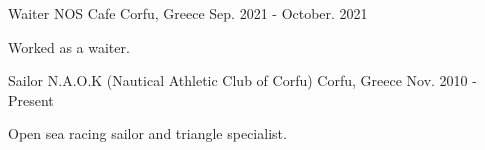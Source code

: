 \begin{cventries}
  \cventry
    {Waiter} %
    {NOS Cafe} %
    {Corfu, Greece} %
    {Sep. 2021 - October. 2021} %
    {
      \begin{cvitems} %
        \item {Worked as a waiter.}
      \end{cvitems}
    }


  \cventry
    {Sailor} %
    {N.A.O.K (Nautical Athletic Club of Corfu)} %
    {Corfu, Greece} %
    {Nov. 2010 - Present} %
    {
      \begin{cvitems} %
        \item {Open sea racing sailor and triangle specialist.}
      \end{cvitems}
    }

\end{cventries}
